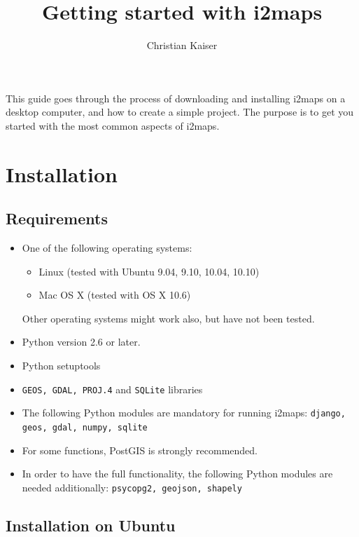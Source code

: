 \documentclass[11pt]{article}
\title{Getting started with i2maps}
\author{Christian Kaiser}
\date{}                     %
\begin{document}
\maketitle


This guide goes through the process of downloading and installing i2maps on a desktop computer, and how to create a simple project. The purpose is to get you started with the most common aspects of i2maps.



\section{Installation}

\subsection{Requirements}

\begin{itemize}
\item One of the following operating systems:
	\begin{itemize}
		\item Linux (tested with Ubuntu 9.04, 9.10, 10.04, 10.10)
		\item Mac OS X (tested with OS X 10.6)
	\end{itemize}
	Other operating systems might work also, but have not been tested.

\item Python version 2.6 or later.
\item Python setuptools
\item \verb=GEOS, GDAL, PROJ.4= and \verb=SQLite= libraries
\item The following Python modules are mandatory for running i2maps: \texttt{django, geos, gdal, numpy, sqlite}
\item For some functions, PostGIS is strongly recommended.
\item In order to have the full functionality, the following Python modules are needed additionally: \texttt{psycopg2, geojson, shapely}
\end{itemize}


\subsection{Installation on Ubuntu}
\end{document}
